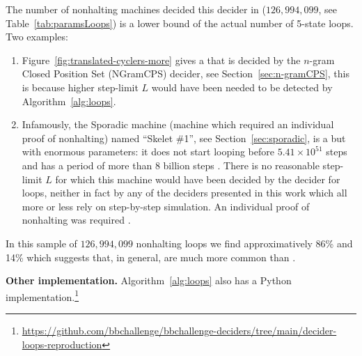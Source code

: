The number of nonhalting machines decided this decider in \CoqBB (\ie $126{,}994{,}099$, see Table~\ref{tab:paramsLoops}) is a lower bound of the actual number of 5-state loops. Two examples:

\begin{enumerate}
  \item Figure~\ref{fig:translated-cyclers-more} gives a \TC that is decided by the $n$-gram Closed Position Set (NGramCPS) decider, see Section~\ref{sec:n-gramCPS}, this is because higher step-limit $L$ would have been needed to be detected by Algorithm~\ref{alg:loops}.
  \item Infamously, the Sporadic machine (\ie machine which required an individual proof of nonhalting) named ``Skelet \#1'', see Section~\ref{sec:sporadic}, is a \TC but with enormous parameters: it does not start looping before $5.41 \times 10^{51}$ steps and has a period of more than 8 billion steps \cite{ShawnSkelet1}. There is no reasonable step-limit $L$ for which this machine would have been decided by the decider for loops, neither in fact by any of the deciders presented in this work which all more or less rely on step-by-step simulation. An individual proof of nonhalting was required \cite{busycoq}.
\end{enumerate}

In this sample of $126{,}994{,}099$ nonhalting loops we find approximatively 86\% \TCs and 14\% \cyclers which suggests that, in general, \TCs are much more common than \cyclers.

\textbf{Other implementation.} Algorithm~\ref{alg:loops} also has a Python implementation.\footnote{\url{https://github.com/bbchallenge/bbchallenge-deciders/tree/main/decider-loops-reproduction}}